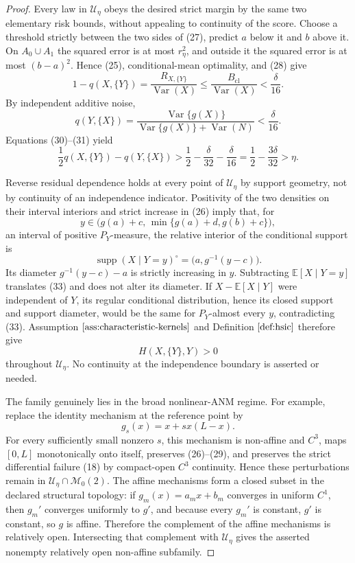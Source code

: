 \documentclass{article}
\begin{document}
\begin{proof}
Every law in \(\mathcal U_\eta\) obeys the desired strict margin by the same two elementary risk bounds, without appealing to continuity of the score.  Choose a threshold strictly between the two sides of (27), predict \(a\) below it and \(b\) above it.  On \(A_0\cup A_1\) the squared error is at most \(r_\eta^2\), and outside it the squared error is at most \((b-a)^2\).  Hence (25), conditional-mean optimality, and (28) give
\[
 1-q(X,\{Y\})
 =\frac{R_{X,\{Y\}}}{\operatorname{Var}(X)}
 \le\frac{B_{\mathrm{cl}}}{\operatorname{Var}(X)}
 <\frac{\delta}{16}. \tag{30}
\]
By independent additive noise,
\[
 q(Y,\{X\})
 =\frac{\operatorname{Var}\{g(X)\}}
 {\operatorname{Var}\{g(X)\}+\operatorname{Var}(N)}
 <\frac{\delta}{16}. \tag{31}
\]
Equations (30)--(31) yield
\[
 \frac12q(X,\{Y\})-q(Y,\{X\})
 >\frac12-\frac{\delta}{32}-\frac{\delta}{16}
 =\frac12-\frac{3\delta}{32}>\eta. \tag{32}
\]

Reverse residual dependence holds at every point of \(\mathcal U_\eta\) by support geometry, not by continuity of an independence indicator.  Positivity of the two densities on their interval interiors and strict increase in (26) imply that, for
\[
 y\in\bigl(g(a)+c,\,\min\{g(a)+d,g(b)+c\}\bigr),
\]
an interval of positive \(P_Y\)-measure, the relative interior of the conditional support is
\[
 \operatorname{supp}(X\mid Y=y)^\circ
 =\bigl(a,g^{-1}(y-c)\bigr). \tag{33}
\]
Its diameter \(g^{-1}(y-c)-a\) is strictly increasing in \(y\).  Subtracting \(\mathbb E[X\mid Y=y]\) translates (33) and does not alter its diameter.  If \(X-\mathbb E[X\mid Y]\) were independent of \(Y\), its regular conditional distribution, hence its closed support and support diameter, would be the same for \(P_Y\)-almost every \(y\), contradicting (33).  Assumption \(\ref{ass:characteristic-kernels}\) and Definition \(\ref{def:hsic}\) therefore give
\[
 H(X,\{Y\},Y)>0 \tag{34}
\]
throughout \(\mathcal U_\eta\).  No continuity at the independence boundary is asserted or needed.

The family genuinely lies in the broad nonlinear-ANM regime.  For example, replace the identity mechanism at the reference point by
\[
 g_s(x)=x+s x(L-x).
\]
For every sufficiently small nonzero \(s\), this mechanism is non-affine and \(C^3\), maps \([0,L]\) monotonically onto itself, preserves (26)--(29), and preserves the strict differential failure (18) by compact-open \(C^3\) continuity.  Hence these perturbations remain in \(\mathcal U_\eta\cap\mathcal M_0(2)\).  The affine mechanisms form a closed subset in the declared structural topology: if \(g_m(x)=a_mx+b_m\) converges in uniform \(C^1\), then \(g_m'\) converges uniformly to \(g'\), and because every \(g_m'\) is constant, \(g'\) is constant, so \(g\) is affine.  Therefore the complement of the affine mechanisms is relatively open.  Intersecting that complement with \(\mathcal U_\eta\) gives the asserted nonempty relatively open non-affine subfamily.


\end{proof}
\end{document}
